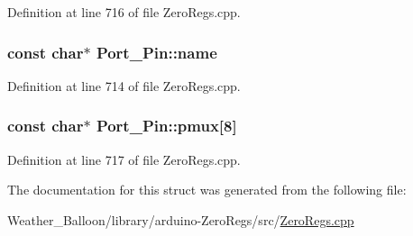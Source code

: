 Definition at line 716 of file Zero\+Regs.\+cpp.

\subsubsection[{\texorpdfstring{name}{name}}]{\setlength{\rightskip}{0pt plus 5cm}const char$\ast$ Port\+\_\+\+Pin\+::name}\hypertarget{struct_port___pin_abdb274a593040cfbdbb903fac65e8a1f}{}\label{struct_port___pin_abdb274a593040cfbdbb903fac65e8a1f}


Definition at line 714 of file Zero\+Regs.\+cpp.

\subsubsection[{\texorpdfstring{pmux}{pmux}}]{\setlength{\rightskip}{0pt plus 5cm}const char$\ast$ Port\+\_\+\+Pin\+::pmux\mbox{[}8\mbox{]}}\hypertarget{struct_port___pin_a7818a63c184b495208403621b5fe7f11}{}\label{struct_port___pin_a7818a63c184b495208403621b5fe7f11}


Definition at line 717 of file Zero\+Regs.\+cpp.



The documentation for this struct was generated from the following file\+:\begin{DoxyCompactItemize}
\item 
Weather\+\_\+\+Balloon/library/arduino-\/\+Zero\+Regs/src/\hyperlink{_zero_regs_8cpp}{Zero\+Regs.\+cpp}\end{DoxyCompactItemize}
